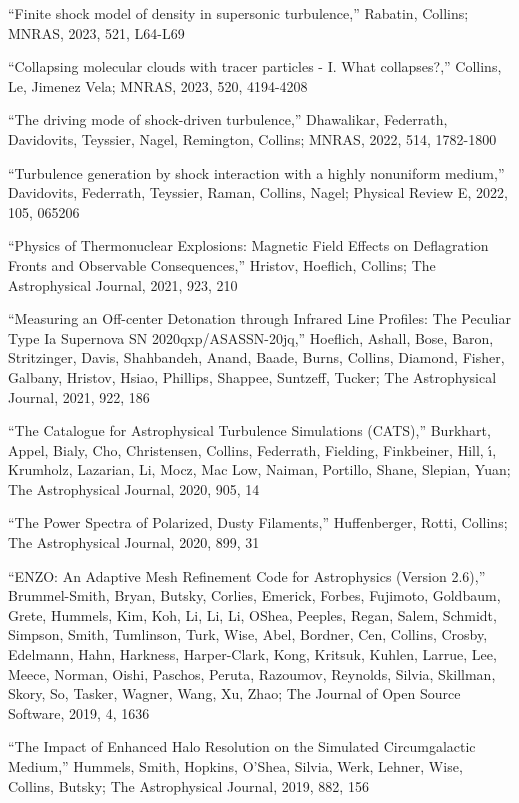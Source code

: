 
\medskip
\noindent ``Finite shock model of density in supersonic turbulence,''
Rabatin, Collins;
MNRAS,
 2023,
521,
L64-L69

\medskip
\noindent ``Collapsing molecular clouds with tracer particles - I. What collapses?,''
Collins, Le, Jimenez Vela;
MNRAS,
 2023,
520,
4194-4208

\medskip
\noindent ``The driving mode of shock-driven turbulence,''
Dhawalikar, Federrath, Davidovits, Teyssier, Nagel, Remington, Collins;
MNRAS,
 2022,
514,
1782-1800

\medskip
\noindent ``Turbulence generation by shock interaction with a highly nonuniform medium,''
Davidovits, Federrath, Teyssier, Raman, Collins, Nagel;
Physical Review E,
 2022,
105,
065206

\medskip
\noindent ``Physics of Thermonuclear Explosions: Magnetic Field Effects on Deflagration Fronts and Observable Consequences,''
Hristov, Hoeflich, Collins;
The Astrophysical Journal,
 2021,
923,
210

\medskip
\noindent ``Measuring an Off-center Detonation through Infrared Line Profiles: The Peculiar Type Ia Supernova SN 2020qxp/ASASSN-20jq,''
Hoeflich, Ashall, Bose, Baron, Stritzinger, Davis, Shahbandeh, Anand, Baade, Burns, Collins, Diamond, Fisher, Galbany, Hristov, Hsiao, Phillips, Shappee, Suntzeff, Tucker;
The Astrophysical Journal,
 2021,
922,
186

\medskip
\noindent ``The Catalogue for Astrophysical Turbulence Simulations (CATS),''
Burkhart, Appel, Bialy, Cho, Christensen, Collins, Federrath, Fielding, Finkbeiner, Hill, \'\i, Krumholz, Lazarian, Li, Mocz, Mac Low, Naiman, Portillo, Shane, Slepian, Yuan;
The Astrophysical Journal,
 2020,
905,
14

\medskip
\noindent ``The Power Spectra of Polarized, Dusty Filaments,''
Huffenberger, Rotti, Collins;
The Astrophysical Journal,
 2020,
899,
31

\medskip
\noindent ``ENZO: An Adaptive Mesh Refinement Code for Astrophysics (Version 2.6),''
Brummel-Smith, Bryan, Butsky, Corlies, Emerick, Forbes, Fujimoto, Goldbaum, Grete, Hummels, Kim, Koh, Li, Li, Li, OShea, Peeples, Regan, Salem, Schmidt, Simpson, Smith, Tumlinson, Turk, Wise, Abel, Bordner, Cen, Collins, Crosby, Edelmann, Hahn, Harkness, Harper-Clark, Kong, Kritsuk, Kuhlen, Larrue, Lee, Meece, Norman, Oishi, Paschos, Peruta, Razoumov, Reynolds, Silvia, Skillman, Skory, So, Tasker, Wagner, Wang, Xu, Zhao;
The Journal of Open Source Software,
 2019,
4,
1636

\medskip
\noindent ``The Impact of Enhanced Halo Resolution on the Simulated Circumgalactic Medium,''
Hummels, Smith, Hopkins, O'Shea, Silvia, Werk, Lehner, Wise, Collins, Butsky;
The Astrophysical Journal,
 2019,
882,
156

